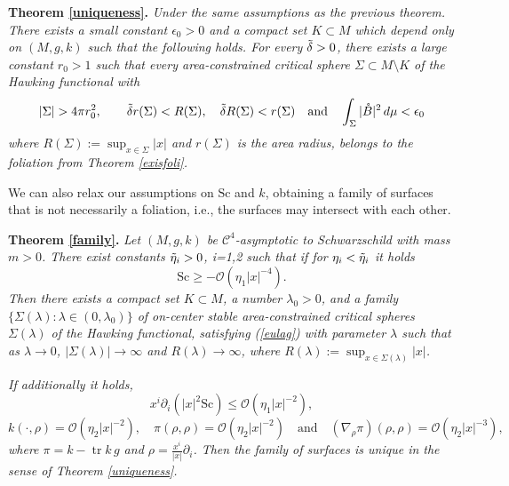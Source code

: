 \documentclass[12pt,a4paper]{amsart}
\theoremstyle{plain}
\theoremstyle{definition}
\newcommand{\tr}{\operatorname{tr}}
\begin{document}
\noindent\textbf{Theorem \ref{uniqueness}.} \emph{Under the same assumptions as the previous theorem. There exists a small constant \(\epsilon_0 > 0\) and a compact set
\(K \subset M\) which depend only on \((M, g, k)\) such that the following holds. For every \(\Tilde{\delta} > 0\), there exists a
large constant \(r_0 > 1\) such that every area-constrained critical sphere \(\Sigma \subset M \setminus K\) of the Hawking functional with
\[
|\Sigma| > 4 \pi r_0^2, \quad \quad \Tilde{\delta} r(\Sigma) < R(\Sigma), \quad \Tilde{\delta} R(\Sigma) < r(\Sigma)  \quad \text{and}\quad \int_{\Sigma} |\mathring{B}|^2 \, d\mu < \epsilon_0 
\]
 where $R(\Sigma):=\sup_{x \in \Sigma } |x|$ and $r(\Sigma)$ is the area radius, belongs to the foliation from Theorem \ref{exisfoli}.}

We can also relax our assumptions on $\mathrm{Sc}$ and $k$, obtaining a family of surfaces that is not necessarily a foliation, i.e., the surfaces may intersect with each other. 

 \noindent\textbf{Theorem \ref{family}.} \emph{Let $(M,g,k)$ be $ \mathcal{C}^4$-asymptotic to Schwarzschild with mass $m>0$. There exist constants $ \Tilde{\eta}_i>0$, i=1,2 such that if for $\eta_i< \Tilde{\eta}_i $ it holds 
     \begin{equation}
         \mathrm{Sc} \geq -\mathcal{O} (\eta_1 |x|^{-4}).
     \end{equation}
  Then there exists a compact set \(K \subset M\), a number \(\lambda_0 > 0\), and a family
\(\{\Sigma(\lambda) : \lambda \in (0, \lambda_0)\}\) of on-center stable area-constrained critical
spheres \(\Sigma(\lambda)\) of the Hawking functional,  satisfying (\ref{eulag}) with parameter \(\lambda\) such that as $\lambda \to 0$, $|\Sigma(\lambda)|\to \infty$ and   $ R(\lambda) \to \infty$, where $R(\lambda):=\sup_{x \in \Sigma(\lambda) } |x|$.} 

\emph{If additionally it holds,
\begin{equation}
     x^i \partial_i (|x|^2 \mathrm{Sc}) \leq \mathcal{O} (\eta_1 |x|^{-2}),
\end{equation}
\begin{equation}
 k(\cdot, \rho) = \mathcal{O} ( \eta_2| x|^{-2}), \quad \pi (\rho, \rho) = \mathcal{O} (\eta_2  | x|^{-2})\quad \text{and} \quad (\nabla_{\rho} \pi) (\rho, \rho)= \mathcal{O} (\eta_2| x|^{-3}),
\end{equation}
where $\pi = k - \tr k\, g$ and $\rho= \frac{x^i}{|x|}\partial_i$. Then the family of surfaces is unique in the sense of Theorem \ref{uniqueness}.}
\end{document}
